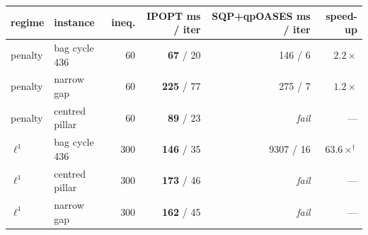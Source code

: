 \begin{tabular}{llrrrr}
  \toprule
  regime & instance & ineq. & IPOPT ms / iter & SQP+qpOASES ms / iter & speed-up \\
  \midrule
  penalty  & bag cycle 436  & 60 & \textbf{67} / 20  & 146 / 6      & $2.2\times$ \\
  penalty  & narrow gap     & 60 & \textbf{225} / 77 & 275 / 7      & $1.2\times$ \\
  penalty  & centred pillar & 60 & \textbf{89} / 23  & \emph{fail}  & --- \\
  \midrule
  $\ell^1$ & bag cycle 436  & 300 & \textbf{146} / 35 & 9307 / 16   & $63.6\times^{\dagger}$ \\
  $\ell^1$ & centred pillar & 300 & \textbf{173} / 46 & \emph{fail} & --- \\
  $\ell^1$ & narrow gap     & 300 & \textbf{162} / 45 & \emph{fail} & --- \\
  \bottomrule
\end{tabular}
